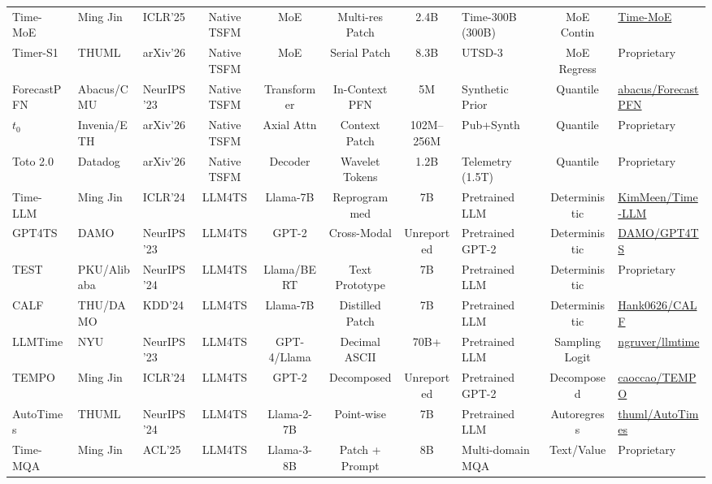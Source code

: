 \begin{table}[t]
{\begin{tabular}{lp{1.8cm}p{1.6cm}ccccp{3.2cm}cl}
Time-MoE~\cite{shi2024timemoe} & Ming Jin & ICLR'25 & Native TSFM & MoE & Multi-res Patch & 2.4B & Time-300B (300B) & MoE Contin & \href{https://github.com/Time-MoE/Time-MoE}{Time-MoE} \\
Timer-S1~\cite{thuml2026timers1} & THUML & arXiv'26 & Native TSFM & MoE & Serial Patch & 8.3B & UTSD-3 & MoE Regress & Proprietary \\
ForecastPFN~\cite{dooley2023forecastpfn} & Abacus/CMU & NeurIPS'23 & Native TSFM & Transformer & In-Context PFN & 5M & Synthetic Prior & Quantile & \href{https://github.com/abacusai/ForecastPFN}{abacus/ForecastPFN} \\
$t_0$~\cite{meyer2026t0} & Invenia/ETH & arXiv'26 & Native TSFM & Axial Attn & Context Patch & 102M--256M & Pub+Synth & Quantile & Proprietary \\
Toto 2.0~\cite{datadog2026toto2} & Datadog & arXiv'26 & Native TSFM & Decoder & Wavelet Tokens & 1.2B & Telemetry (1.5T) & Quantile & Proprietary \\
\midrule
Time-LLM~\cite{jin2023timellm} & Ming Jin & ICLR'24 & LLM4TS & Llama-7B & Reprogrammed & 7B & Pretrained LLM & Deterministic & \href{https://github.com/KimMeen/Time-LLM}{KimMeen/Time-LLM} \\
GPT4TS~\cite{zhou2023onefitsall} & DAMO & NeurIPS'23 & LLM4TS & GPT-2 & Cross-Modal & Unreported & Pretrained GPT-2 & Deterministic & \href{https://github.com/DAMO-DI-ML/NeurIPS2023-One-Fits-All}{DAMO/GPT4TS} \\
TEST~\cite{sun2023test} & PKU/Alibaba & NeurIPS'24 & LLM4TS & Llama/BERT & Text Prototype & 7B & Pretrained LLM & Deterministic & Proprietary \\
CALF~\cite{liu2024calf} & THU/DAMO & KDD'24 & LLM4TS & Llama-7B & Distilled Patch & 7B & Pretrained LLM & Deterministic & \href{https://github.com/Hank0626/CALF}{Hank0626/CALF} \\
LLMTime~\cite{gruver2023llmtime} & NYU & NeurIPS'23 & LLM4TS & GPT-4/Llama & Decimal ASCII & 70B+ & Pretrained LLM & Sampling Logit & \href{https://github.com/ngruver/llmtime}{ngruver/llmtime} \\
TEMPO~\cite{cao2023tempo} & Ming Jin & ICLR'24 & LLM4TS & GPT-2 & Decomposed & Unreported & Pretrained GPT-2 & Decomposed & \href{https://github.com/caoccao/TEMPO}{caoccao/TEMPO} \\
AutoTimes~\cite{liu2024autotimes} & THUML & NeurIPS'24 & LLM4TS & Llama-2-7B & Point-wise & 7B & Pretrained LLM & Autoregress & \href{https://github.com/thuml/AutoTimes}{thuml/AutoTimes} \\
Time-MQA~\cite{jin2025timemqa} & Ming Jin & ACL'25 & LLM4TS & Llama-3-8B & Patch + Prompt & 8B & Multi-domain MQA & Text/Value & Proprietary \\
\bottomrule
\end{tabular}
}
\end{table}
